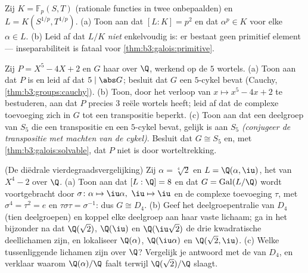 \begin{exercise}[$\star\star\star$]\label{exo:b3:galois:10}
Zij $K = \mathbb F_p(S, T)$ (rationale functies in twee
onbepaalden) en $L = K(S^{1/p}, T^{1/p})$.
(a) Toon aan dat $[L:K] = p^2$ en dat $\alpha^p \in K$ voor elke
$\alpha \in L$.
(b) Leid af dat $L/K$ \emph{niet} enkelvoudig is: er bestaat geen
primitief element --- inseparabiliteit is fataal voor
\cref{thm:b3:galois:primitive}.
\end{exercise}

\begin{exercise}[$\star\star\star$]\label{exo:b3:galois:11}
Zij $P = X^5 - 4X + 2$ en $G$ haar  over $\Q$, werkend
op de $5$ wortels.
(a) Toon aan dat $P$  is en leid af dat $5 \mid \abs
G$; besluit dat $G$ een $5$-cykel bevat (Cauchy,
\cref{thm:b3:groups:cauchy}).
(b) Toon, door het verloop van $x \mapsto x^5 - 4x + 2$ te
bestuderen, aan dat $P$ precies $3$ reële wortels heeft; leid af
dat de complexe toevoeging zich in $G$ tot een transpositie
beperkt.
(c) Toon aan dat een deelgroep van $S_5$ die een transpositie en
een $5$-cykel bevat, gelijk is aan $S_5$ \emph{(conjugeer de
transpositie met machten van de cykel)}. Besluit dat $G \cong S_5$
en, met \cref{thm:b3:galois:solvable}, dat $P$ niet  is
door worteltrekking.
\end{exercise}

\begin{exercise}[$\star\star\star$]\label{exo:b3:galois:12}
(De diëdrale vierdegraadsvergelijking) Zij $\alpha = \sqrt[4]2$ en
$L = \Q(\alpha, \iu)$, het  van $X^4 - 2$ over
$\Q$.
(a) Toon aan dat $[L : \Q] = 8$ en dat $G =
\operatorname{Gal}(L/\Q)$ wordt voortgebracht door
$\sigma\colon \alpha \mapsto \iu\alpha,\ \iu \mapsto \iu$ en de
complexe toevoeging $\tau$, met $\sigma^4 = \tau^2 = e$ en
$\tau\sigma\tau = \sigma^{-1}$: dus $G \cong D_4$.
(b) Geef het deelgroepentralie van $D_4$ (tien deelgroepen) en
koppel elke deelgroep aan haar vaste lichaam; ga in het bijzonder
na dat $\Q(\sqrt2)$, $\Q(\iu)$ en $\Q(\iu\sqrt2)$ de drie
kwadratische deellichamen zijn, en lokaliseer $\Q(\alpha)$,
$\Q(\iu\alpha)$ en $\Q(\sqrt2, \iu)$.
(c) Welke tussenliggende lichamen zijn  over $\Q$? Vergelijk
je antwoord met de  van $D_4$, en verklaar waarom
$\Q(\alpha)/\Q$ faalt terwijl $\Q(\sqrt2)/\Q$ slaagt.
\end{exercise}

